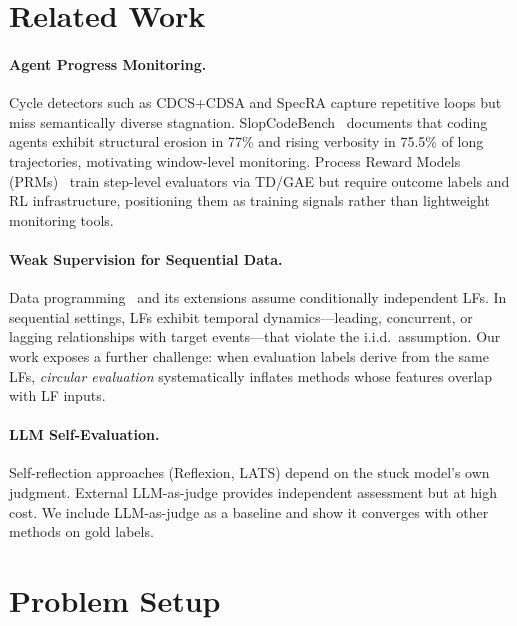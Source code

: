\documentclass[11pt,a4paper]{article}
\begin{document}
\section{Related Work}
\label{sec:related}

\paragraph{Agent Progress Monitoring.}
Cycle detectors such as CDCS+CDSA and SpecRA capture repetitive loops but miss semantically diverse stagnation.
SlopCodeBench~\cite{slopcodebench2026} documents that coding agents exhibit structural erosion in 77\% and rising verbosity in 75.5\% of long trajectories, motivating window-level monitoring.
Process Reward Models (PRMs)~\cite{agentprm2026,prm2025} train step-level evaluators via TD/GAE but require outcome labels and RL infrastructure, positioning them as training signals rather than lightweight monitoring tools.

\paragraph{Weak Supervision for Sequential Data.}
Data programming~\cite{ratner2017snorkel} and its extensions assume conditionally independent LFs.
In sequential settings, LFs exhibit temporal dynamics---leading, concurrent, or lagging relationships with target events---that violate the i.i.d.\ assumption.
Our work exposes a further challenge: when evaluation labels derive from the same LFs, \emph{circular evaluation} systematically inflates methods whose features overlap with LF inputs.

\paragraph{LLM Self-Evaluation.}
Self-reflection approaches (Reflexion, LATS) depend on the stuck model's own judgment.
External LLM-as-judge provides independent assessment but at high cost.
We include LLM-as-judge as a baseline and show it converges with other methods on gold labels.

\section{Problem Setup}
\label{sec:setup}
\end{document}
